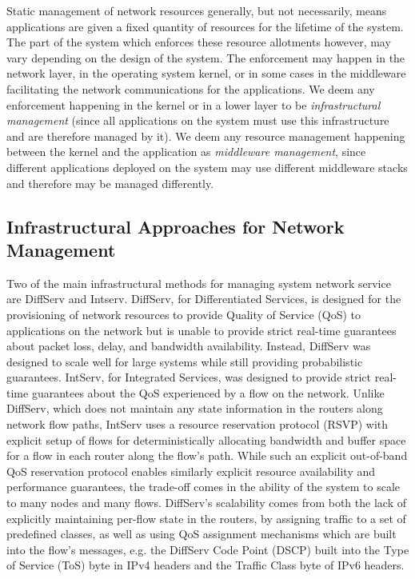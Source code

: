 Static management of network resources generally, but not necessarily,
means applications are given a fixed quantity of resources for the
lifetime of the system.  The part of the system which enforces these
resource allotments however, may vary depending on the design of the
system.  The enforcement may happen in the network layer, in the
operating system kernel, or in some cases in the middleware
facilitating the network communications for the applications.  We deem
any enforcement happening in the kernel or in a lower layer to be
\textit{infrastructural management} (since all applications on the
system must use this infrastructure and are therefore managed by it).
We deem any resource management happening between the kernel and the
application as \textit{middleware management}, since different
applications deployed on the system may use different middleware
stacks and therefore may be managed differently.


\subsection{Infrastructural Approaches for Network Management}
\label{subsec:related_part2_infrastructural}

Two of the main infrastructural methods for managing system network
service are DiffServ\cite{rfc2474}\cite{QT_Giambene2005} and
Intserv\cite{rfc1633}.  DiffServ, for Differentiated Services, is
designed for the provisioning of network resources to provide Quality
of Service (QoS) to applications on the network but is unable to
provide strict real-time guarantees about packet loss, delay, and
bandwidth availability.  Instead, DiffServ was designed to scale well
for large systems while still providing probabilistic guarantees.
IntServ, for Integrated Services, was designed to provide strict
real-time guarantees about the QoS experienced by a flow on the
network.  Unlike DiffServ, which does not maintain any state
information in the routers along network flow paths, IntServ uses a
resource reservation protocol (RSVP)\cite{rfc2205} with explicit setup
of flows for deterministically allocating bandwidth and buffer space
for a flow in each router along the flow's path.  While such an
explicit out-of-band QoS reservation protocol enables similarly
explicit resource availability and performance guarantees, the
trade-off comes in the ability of the system to scale to many nodes
and many flows.  DiffServ's scalability comes from both the lack of
explicitly maintaining per-flow state in the routers, by assigning
traffic to a set of predefined classes, as well as using QoS
assignment mechanisms which are built into the flow's messages,
e.g. the DiffServ Code Point (DSCP) built into the Type of Service
(ToS) byte in IPv4 headers and the Traffic Class byte of IPv6 headers.

